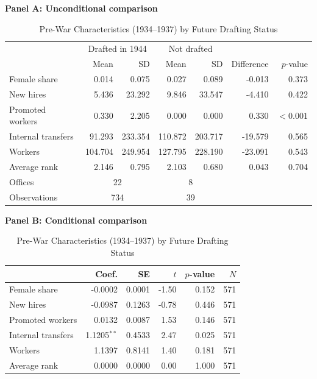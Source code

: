 \begin{table}[htbp]
\centering
\caption{Pre-War Characteristics (1934--1937) by Future Drafting Status}
\label{tab:balance}
\scriptsize
\begin{threeparttable}
\textbf{Panel A: Unconditional comparison}\par\smallskip
\begin{tabular}{lrrrrrr}
\toprule
& \multicolumn{2}{c}{Drafted in 1944} & \multicolumn{2}{c}{Not drafted} &&\\
& Mean & SD & Mean & SD & Difference & $p$-value\\
\midrule
Female share & 0.014 & 0.075 & 0.027 & 0.089 & -0.013 & 0.373\\
New hires & 5.436 & 23.292 & 9.846 & 33.547 & -4.410 & 0.422\\
Promoted workers & 0.330 & 2.205 & 0.000 & 0.000 & 0.330 & $<0.001$\\
Internal transfers & 91.293 & 233.354 & 110.872 & 203.717 & -19.579 & 0.565\\
Workers & 104.704 & 249.954 & 127.795 & 228.190 & -23.091 & 0.543\\
Average rank & 2.146 & 0.795 & 2.103 & 0.680 & 0.043 & 0.704\\
\midrule
Offices & \multicolumn{2}{c}{22} & \multicolumn{2}{c}{8} &&\\
Observations & \multicolumn{2}{c}{734} & \multicolumn{2}{c}{39} &&\\
\bottomrule
\end{tabular}

\bigskip
\textbf{Panel B: Conditional comparison}\par\smallskip
\begin{tabular}{lrrrrr}
\toprule
& Coef. & SE & $t$ & $p$-value & $N$\\
\midrule
Female share & -0.0002 & 0.0001 & -1.50 & 0.152 & 571\\
New hires & -0.0987 & 0.1263 & -0.78 & 0.446 & 571\\
Promoted workers & 0.0132 & 0.0087 & 1.53 & 0.146 & 571\\
Internal transfers & 1.1205$^{**}$ & 0.4533 & 2.47 & 0.025 & 571\\
Workers & 1.1397 & 0.8141 & 1.40 & 0.181 & 571\\
Average rank & 0.0000 & 0.0000 & 0.00 & 1.000 & 571\\
\bottomrule
\end{tabular}


\end{threeparttable}
\end{table}
